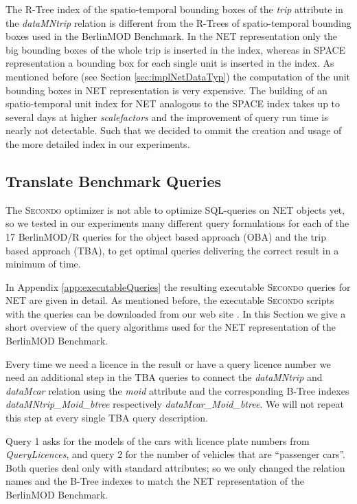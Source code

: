 \documentclass[a4paper]{article}
\newcommand{\secondo}{\textsc{Secondo}}
\newcommand{\bmodb} {BerlinMOD Benchmark}
\begin{document}
The R-Tree index of the spatio-temporal bounding boxes of the \textit{trip}
attribute in the \textit{dataMNtrip} relation is different from the
R-Trees of spatio-temporal bounding boxes used in the \bmodb{}.
In the NET representation only the big bounding boxes of the whole trip is
inserted in the index, whereas in SPACE representation a bounding box for each
single unit is inserted in the index. As mentioned before (see Section
\ref{sec:implNetDataTyp}) the computation of the unit bounding boxes in NET
representation is very expensive. The building of an spatio-temporal unit index
for NET analogous to the SPACE index takes up to several days at higher
\textit{scalefactors} and the improvement of query run time is nearly not detectable.
Such that we decided to ommit the creation and usage of the more detailed index
in our experiments.
\subsection{Translate Benchmark Queries}
\label{sec:queries}
The \secondo{} optimizer is not able to optimize SQL-queries on NET objects yet,
so we tested in our experiments many different query formulations for each of
the 17 BerlinMOD/R queries for the object based approach (OBA) and the trip based
approach (TBA), to get optimal queries delivering the correct result in a minimum
of time.

In Appendix \ref{app:executableQueries} the resulting executable
\secondo{} queries for NET are given in detail. As mentioned before, the
executable \secondo{} scripts with the queries can be downloaded from our
web site \cite{NetworkWeb}.
In this Section we give a short overview of the query algorithms used for the
NET representation of the \bmodb{}.

Every time we need a licence in the result or have a query licence number we
need
an additional step in the TBA queries to connect the \textit{dataMNtrip} and
\textit{dataMcar}
relation using the \textit{moid} attribute and the corresponding B-Tree indexes
\textit{dataMNtrip\_Moid\_btree} respectively \textit{dataMcar\_Moid\_btree}.
We will not repeat this step at every single TBA query description.

Query 1 asks for the models of the cars with licence plate numbers from
\textit{QueryLicences},
and query 2 for the number of vehicles that are ``passenger cars''. Both queries
deal only with standard attributes; so we only changed the relation names and
the
B-Tree indexes to match the NET representation of the \bmodb{}.
\end{document}
